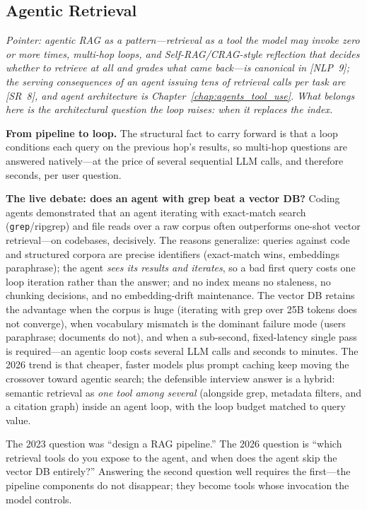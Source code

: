 \subsection{Agentic Retrieval}

\textit{Pointer: agentic RAG as a \emph{pattern}---retrieval as a tool the model may invoke zero or more times, multi-hop loops, and Self-RAG/CRAG-style reflection that decides whether to retrieve at all and grades what came back---is canonical in [NLP~9]; the serving consequences of an agent issuing tens of retrieval calls per task are [SR~8], and agent architecture is Chapter~\ref{chap:agents_tool_use}. What belongs here is the architectural question the loop raises: when it replaces the index.}

\textbf{From pipeline to loop.} The structural fact to carry forward is that a loop conditions each query on the previous hop's results, so multi-hop questions are answered natively---at the price of several sequential LLM calls, and therefore seconds, per user question.

\textbf{The live debate: does an agent with grep beat a vector DB?} Coding agents demonstrated that an agent iterating with exact-match search (\texttt{grep}/ripgrep) and file reads over a raw corpus often outperforms one-shot vector retrieval---on codebases, decisively. The reasons generalize: queries against code and structured corpora are precise identifiers (exact-match wins, embeddings paraphrase); the agent \textit{sees its results and iterates}, so a bad first query costs one loop iteration rather than the answer; and no index means no staleness, no chunking decisions, and no embedding-drift maintenance. The vector DB retains the advantage when the corpus is huge (iterating with grep over 25B tokens does not converge), when vocabulary mismatch is the dominant failure mode (users paraphrase; documents do not), and when a sub-second, fixed-latency single pass is required---an agentic loop costs several LLM calls and seconds to minutes. The 2026 trend is that cheaper, faster models plus prompt caching keep moving the crossover toward agentic search; the defensible interview answer is a hybrid: semantic retrieval as \textit{one tool among several} (alongside grep, metadata filters, and a citation graph) inside an agent loop, with the loop budget matched to query value.

\begin{keyinsight}
The 2023 question was ``design a RAG pipeline.'' The 2026 question is ``which retrieval tools do you expose to the agent, and when does the agent skip the vector DB entirely?'' Answering the second question well requires the first---the pipeline components do not disappear; they become tools whose invocation the model controls.
\end{keyinsight}

